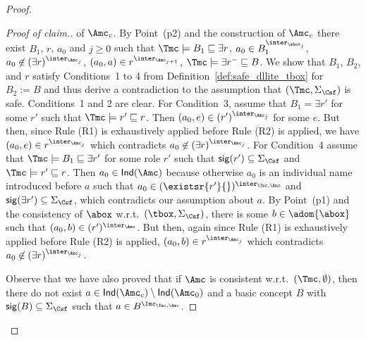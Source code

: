 \documentclass{lmcs}
\theoremstyle{definition}
\let\OriginalQedSymbol\qedsymbol
\renewcommand{\qedsymbol}{\OriginalQedSymbol\setcounter{claim}{0}}
\let\NormalQedSymbol\qedsymbol
\newenvironment{clmproof}[1]{\renewcommand{\qedsymbol}{$\dashv$}\begin{proof}[Proof of claim.]\space#1}{\end{proof}\renewcommand{\qedsymbol}{\NormalQedSymbol}}
\begin{document}
\begin{proof}
\begin{clmproof}
of $\Amc_{c}$. By Point~(p2) and the construction of $\Amc_{c}$ there exist $B_{1}$, $r$, $a_{0}$ and $j\geq 0$ such that
$\Tmc\models B_{1} \sqsubseteq \exists r$, $a_{0}\in B_{1}^{\inter_{\abox_j}}$,
    $a_{0}\not\in(\exists r)^{\inter_{\Amc_{j}}}$,
    $(a_{0},a)\in r^{\inter_{\Amc_{j+1}}}$,
    $\Tmc\models \exists r^{-}\sqsubseteq B$.
    We show that $B_{1}$, $B_{2}$, and $r$ satisfy Conditions~1 to 4 from 
    Definition~\ref{def:safe_dllite_tbox} for $B_{2}:=B$ and thus derive a contradiction 
    to the assumption that $(\Tmc,\Sigma_\Csf)$ is safe. Conditions~1 and 
    2 are clear. For Condition~3, assume that $B_{1}= \exists r'$ for 
    some $r'$ such that $\Tmc\models r'\sqsubseteq r$. Then $(a_{0},e)\in 
    (r')^{\inter_{\Amc_{j}}}$ for some $e$. But then, since Rule (R1) is exhaustively
    applied before Rule (R2) is applied, we have $(a_{0},e)\in 
    r^{\inter_{\Amc_{j}}}$ which contradicts $a_{0}\not\in (\exists 
    r)^{\inter_{\Amc_{j}}}$. For Condition~4 assume that $\Tmc\models 
    B_{1} \sqsubseteq \exists r'$ for some role $r'$ such that ${\sf 
    sig}(r')\subseteq \Sigma_\Csf$ and $\Tmc\models r'\sqsubseteq r$. 
    Then $a_{0} \in {\sf Ind}(\Amc)$ because otherwise $a_{0}$ is an individual name 
    introduced before $a$ such that $a_{0}\in(\existsr{r'}{})^{\inter_{\Tmc,\Amc}}$ and 
    ${\sf sig}(\exists r')\subseteq \Sigma_\Csf$, which contradicts our 
    assumption about $a$. By Point~(p1) and the consistency of $\abox$ 
    w.r.t.\ $(\tbox,\Sigma_\Csf)$, there is some $b\in\adom{\abox}$ such 
    that $(a_{0},b)\in (r')^{\inter_\Amc}$. But then, again since Rule (R1) is exhaustively
    applied before Rule (R2) is applied, $(a_{0},b)\in 
    r^{\inter_{\Amc_{j}}}$ which contradicts $a_{0}\not\in (\exists 
    r)^{\inter_{\Amc_{j}}}$. 

Observe that we have also proved that if $\Amc$ is consistent w.r.t.~$(\Tmc,\emptyset)$, then
there do not exist $a\in {\sf Ind}(\Amc_{c})\setminus{\sf Ind}(\Amc_{0})$ 
and a basic concept $B$ with ${\sf sig}(B)\subseteq \Sigma_\Csf$ such that $a\in B^{\Imc_{\Tmc,\Amc}}$. 
\end{clmproof}


\end{proof}
\end{document}
